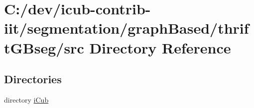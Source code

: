 \section{C\+:/dev/icub-\/contrib-\/iit/segmentation/graph\+Based/thrift\+G\+Bseg/src Directory Reference}
\label{dir_17577debad2190b7f7e6dd9464b475fe}
\subsection*{Directories}
\begin{DoxyCompactItemize}
\item 
directory \hyperlink{dir_3e29d0d99a5144b4df7d1014c756c8f1}{i\+Cub}
\end{DoxyCompactItemize}
